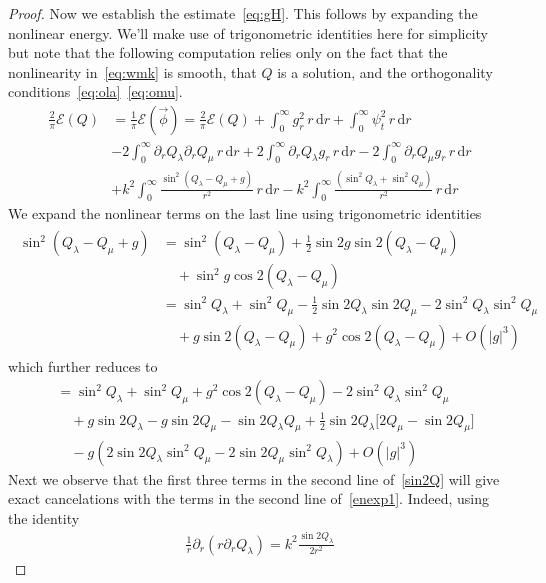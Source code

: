 \documentclass[10pt,reqno]{amsart}
\newcommand{\E}{\mathcal{E}}
\newcommand{\la}{\lambda}
\newcommand{\p}{\partial}
\newcommand{\I}{\infty}
\newcommand{\abs}[1]{\left\lvert{#1}\right\rvert}
\newcommand{\ant}[1]{\begin{align*}\begin{split} #1 \end{split}\end{align*}}
\newcommand{\EQ}[1]{\begin{equation}\begin{split} #1 \end{split}\end{equation}}
\numberwithin{equation}{section}
\theoremstyle{remark}
\newcommand{\rdr}{ \, r \, \mathrm{d}r}
\newcommand{\0}{\emptyset}
\begin{document}
\begin{proof}
Now we establish the estimate~\eqref{eq:gH}. This follows by expanding the nonlinear energy. We'll make use of trigonometric identities here for simplicity but note that the following computation relies only on the fact that the nonlinearity in~\eqref{eq:wmk} is smooth, that $Q$ is a solution, and the orthogonality conditions~\eqref{eq:ola}~\eqref{eq:omu}.  
\EQ{ \label{enexp1}
\frac{2}{\pi} \E(Q) &= \frac{1}{ \pi}\E( \vec \phi) = \frac{2}{\pi} \E(Q) + \int_0^\infty g_r^2    \rdr  + \int_0^\I \psi_t^2 \rdr \\
& - 2 \int_0^{\infty}  \p_r Q_\la \p_r Q_\mu \rdr + 2 \int_0^\infty  \p_r Q_\la g_r \rdr - 2 \int_0^\infty  \p_r Q_\mu g_r \rdr \\
&  + k^2 \int_0^\I  \frac{ \sin^2( Q_\la- Q_\mu + g)}{r^2} \rdr - k^2 \int_0^\I  \frac{ (\sin^2 Q_\la + \sin^2 Q_\mu )}{r^2} \rdr 
}
We expand the nonlinear terms on the last line using trigonometric  identities  
\ant{
 \sin^2( Q_\la - Q_\mu + g)  &= \sin^2 (Q_\la - Q_{\mu})    + \frac{1}{2}\sin 2 g \sin2(Q_\la- Q_\mu)    \\
  &\quad + \sin^2 g  \cos 2(Q_\la - Q_\mu)\\
 & =     \sin^2 Q_\la + \sin^2 Q_\mu  - \frac{1}{2} \sin2Q_\la \sin2 Q_\mu - 2 \sin ^2Q_\la \sin^2 Q_\mu \\
 & \quad +  g \sin 2(Q_\la - Q_\mu) + g^2 \cos2(Q_\la - Q_\mu) +O(\abs{g}^3)%
 }
 which further reduces to 
\EQ{  \label{sin2Q}
 & =  \sin^2 Q_\la + \sin^2 Q_\mu  +  g^2 \cos2(Q_\la - Q_\mu)   - 2 \sin ^2Q_\la \sin^2 Q_\mu \\
 & \quad +  g \sin 2Q_\la  - g \sin 2 Q_\mu    -  \sin2Q_\la Q_\mu  + \frac{1}{2} \sin 2Q_{\la}  \big[2Q_\mu - \sin 2Q_\mu]\\
 & \quad - g (2\sin 2Q_\la \sin^2Q_\mu - 2\sin 2Q_\mu \sin^2Q_\la)  + O(\abs{g}^3) %
}
Next we observe that the first three terms in the second line of~\eqref{sin2Q} will give exact cancelations with the terms in the second line of~\eqref{enexp1}. Indeed, using the identity 
\EQ{
 \frac{1}{r} \p_r( r \p_r Q_\la) = k^2\frac{\sin 2 Q_\la}{2r^2}
 }

\end{proof}
\end{document}
